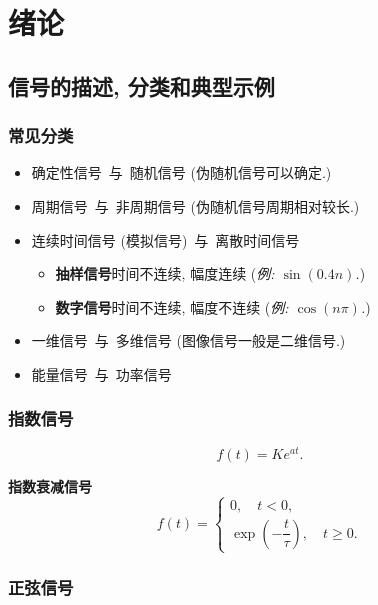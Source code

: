 \section{绪论} \label{绪论}
\subsection{信号的描述, 分类和典型示例}
\subsubsection{常见分类}

\begin{itemize}
    \item 确定性信号\ 与\ 随机信号 (伪随机信号可以确定.)
    \item 周期信号\ 与\ 非周期信号 (伪随机信号周期相对较长.)
    \item 连续时间信号 (模拟信号)\ 与\ 离散时间信号
          \begin{itemize}
              \item \textbf{抽样信号}\quad 时间不连续, 幅度连续 (\textit{例: $\sin(0.4n)$.})
              \item \textbf{数字信号}\quad 时间不连续, 幅度不连续 (\textit{例: $\cos(n\pi)$.})
          \end{itemize}
    \item 一维信号\ 与\ 多维信号 (图像信号一般是二维信号.)
    \item 能量信号\ 与\ 功率信号
\end{itemize}

\subsubsection{指数信号}

\rmg
\begin{equation}
    f(t)=Ke^{at}.
\end{equation}

\textbf{指数衰减信号}
\begin{equation}
    f(t)=\begin{cases}
        0,\quad t<0, \\
        \exp\left(-\dfrac{t}{\tau}\right),\quad t\geq 0.
    \end{cases}
\end{equation}

\subsubsection{正弦信号}

